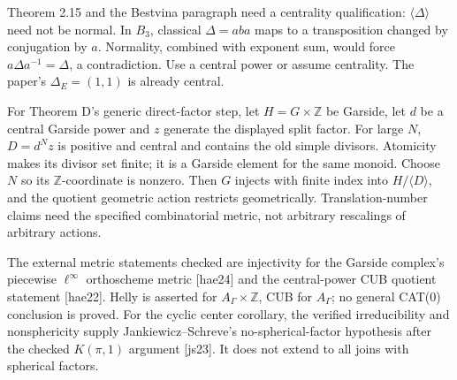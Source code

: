 \documentclass[10pt]{article}
\begin{document}
Theorem 2.15 and the Bestvina paragraph need a centrality qualification: \(\langle\Delta\rangle\) need not be normal. In \(B_3\), classical \(\Delta=aba\) maps to a transposition changed by conjugation by \(a\). Normality, combined with exponent sum, would force \(a\Delta a^{-1}=\Delta\), a contradiction. Use a central power or assume centrality. The paper’s \(\Delta_E=(1,1)\) is already central.\par
For Theorem D’s generic direct-factor step, let \(H=G\times\mathbb Z\) be Garside, let \(d\) be a central Garside power and \(z\) generate the displayed split factor. For large \(N\), \(D=d^Nz\) is positive and central and contains the old simple divisors. Atomicity makes its divisor set finite; it is a Garside element for the same monoid. Choose \(N\) so its \(\mathbb Z\)-coordinate is nonzero. Then \(G\) injects with finite index into \(H/\langle D\rangle\), and the quotient geometric action restricts geometrically. Translation-number claims need the specified combinatorial metric, not arbitrary rescalings of arbitrary actions.\par
The external metric statements checked are injectivity for the Garside complex’s piecewise \(\ell^\infty\) orthoscheme metric [hae24] and the central-power CUB quotient statement [hae22]. Helly is asserted for \(A_\Gamma\times\mathbb Z\), CUB for \(A_\Gamma\); no general CAT(0) conclusion is proved. For the cyclic center corollary, the verified irreducibility and nonsphericity supply Jankiewicz–Schreve’s no-spherical-factor hypothesis after the checked \(K(\pi,1)\) argument [js23]. It does not extend to all joins with spherical factors.\par
\end{document}
